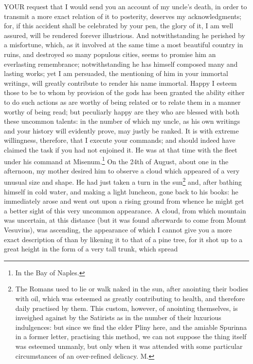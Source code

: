 YOUR request that I would send you an account of my uncle's death, in
order to transmit a more exact relation of it to posterity, deserves my
acknowledgments; for, if this accident shall be celebrated by your pen,
the glory of it, I am well assured, will be rendered forever illustrious.
And notwithstanding he perished by a misfortune, which, as it involved at
the same time a most beautiful country in ruins, and destroyed so many
populous cities, seems to promise him an everlasting remembrance;
notwithstanding he has himself composed many and lasting works; yet I am
persuaded, the mentioning of him in your immortal writings, will greatly
contribute to render his name immortal. Happy I esteem those to be to whom
by provision of the gods has been granted the ability either to do such
actions as are worthy of being related or to relate them in a manner
worthy of being read; but peculiarly happy are they who are blessed with
both these uncommon talents: in the number of which my uncle, as his own
writings and your history will evidently prove, may justly be ranked. It
is with extreme willingness, therefore, that I execute your commands; and
should indeed have claimed the task if you had not enjoined it. He was at
that time with the fleet under his command at Misenum.\footnote{In the Bay of Naples.} On
the 24th of August, about one in the afternoon, my mother desired him to
observe a cloud which appeared of a very unusual size and shape. He had
just taken a turn in the sun\footnote{The Romans used to lie or
walk naked in the sun, after anointing their bodies with oil, which was
esteemed as greatly contributing to health, and therefore daily practised
by them. This custom, however, of anointing themselves, is inveighed
against by the Satirists as in the number of their luxurious indulgences:
but since we find the elder Pliny here, and the amiable Spurinna in a
former letter, practising this method, we can not suppose the thing itself
was esteemed unmanly, but only when it was attended with some particular
circumstances of an over-refined delicacy. M.} and, after bathing himself in cold water, and
making a light luncheon, gone back to his books: he immediately arose and
went out upon a rising ground from whence he might get a better sight of
this very uncommon appearance. A cloud, from which mountain was uncertain,
at this distance (but it was found afterwards to come from Mount
Vesuvius), was ascending, the appearance of which I cannot give you a more
exact description of than by likening it to that of a pine tree, for it
shot up to a great height in the form of a very tall trunk, which spread
